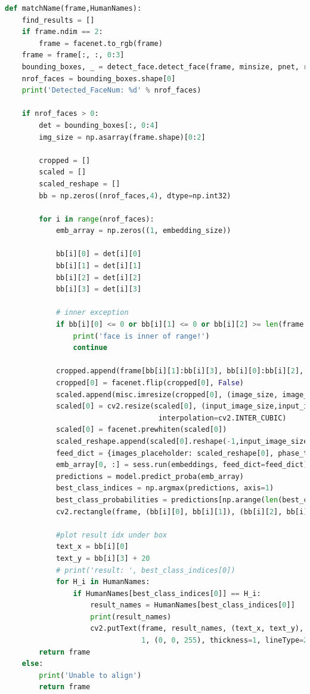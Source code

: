 \documentclass[onecolumn, draftclsnofoot,10pt, compsoc]{IEEEtran}
\begin{document}
    \begin{lstlisting}[language=Python, caption={FaceNet and OpenCV Realtime Face Detection}, basicstyle=\scriptsize]
def matchName(frame,HumanNames):
    find_results = []
    if frame.ndim == 2:
        frame = facenet.to_rgb(frame)
    frame = frame[:, :, 0:3]
    bounding_boxes, _ = detect_face.detect_face(frame, minsize, pnet, rnet, onet, threshold, factor)
    nrof_faces = bounding_boxes.shape[0]
    print('Detected_FaceNum: %d' % nrof_faces)

    if nrof_faces > 0:
        det = bounding_boxes[:, 0:4]
        img_size = np.asarray(frame.shape)[0:2]

        cropped = []
        scaled = []
        scaled_reshape = []
        bb = np.zeros((nrof_faces,4), dtype=np.int32)

        for i in range(nrof_faces):
            emb_array = np.zeros((1, embedding_size))

            bb[i][0] = det[i][0]
            bb[i][1] = det[i][1]
            bb[i][2] = det[i][2]
            bb[i][3] = det[i][3]

            # inner exception
            if bb[i][0] <= 0 or bb[i][1] <= 0 or bb[i][2] >= len(frame[0]) or bb[i][3] >= len(frame):
                print('face is inner of range!')
                continue

            cropped.append(frame[bb[i][1]:bb[i][3], bb[i][0]:bb[i][2], :])
            cropped[0] = facenet.flip(cropped[0], False)
            scaled.append(misc.imresize(cropped[0], (image_size, image_size), interp='bilinear'))
            scaled[0] = cv2.resize(scaled[0], (input_image_size,input_image_size),
                                    interpolation=cv2.INTER_CUBIC)
            scaled[0] = facenet.prewhiten(scaled[0])
            scaled_reshape.append(scaled[0].reshape(-1,input_image_size,input_image_size,3))
            feed_dict = {images_placeholder: scaled_reshape[0], phase_train_placeholder: False}
            emb_array[0, :] = sess.run(embeddings, feed_dict=feed_dict)
            predictions = model.predict_proba(emb_array)
            best_class_indices = np.argmax(predictions, axis=1)
            best_class_probabilities = predictions[np.arange(len(best_class_indices)), best_class_indices]
            cv2.rectangle(frame, (bb[i][0], bb[i][1]), (bb[i][2], bb[i][3]), (0, 255, 0), 2)    #boxing face

            #plot result idx under box
            text_x = bb[i][0]
            text_y = bb[i][3] + 20
            # print('result: ', best_class_indices[0])
            for H_i in HumanNames:
                if HumanNames[best_class_indices[0]] == H_i:
                    result_names = HumanNames[best_class_indices[0]]
                    print(result_names)
                    cv2.putText(frame, result_names, (text_x, text_y), cv2.FONT_HERSHEY_COMPLEX_SMALL,
                                1, (0, 0, 255), thickness=1, lineType=2)
        return frame
    else:
        print('Unable to align')
        return frame
    \end{lstlisting} 
\end{document}
